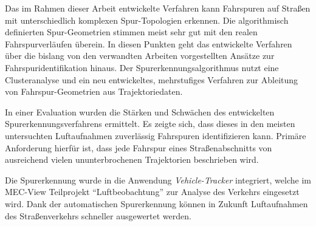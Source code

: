 Das im Rahmen dieser Arbeit entwickelte Verfahren kann Fahrspuren auf Straßen mit unterschiedlich komplexen Spur-Topologien erkennen.
Die algorithmisch definierten Spur-Geometrien stimmen meist sehr gut mit den realen
Fahrspurverläufen überein. In diesen Punkten geht das entwickelte Verfahren über die bislang von den
verwandten Arbeiten vorgestellten Ansätze zur Fahrspuridentifikation hinaus.
Der Spurerkennungsalgorithmus nutzt eine Clusteranalyse und ein neu entwickeltes, mehrstufiges Verfahren zur
Ableitung von Fahrspur-Geometrien aus Trajektoriedaten.

In einer Evaluation wurden die Stärken und Schwächen des entwickelten Spurerkennungsverfahrens ermittelt.
Es zeigte sich, dass dieses in den meisten untersuchten Luftaufnahmen zuverlässig Fahrspuren identifizieren kann.
Primäre Anforderung hierfür ist, dass jede Fahrspur eines Straßenabschnitts von ausreichend vielen ununterbrochenen
Trajektorien beschrieben wird.

Die Spurerkennung wurde in die Anwendung \textit{Vehicle-Tracker} integriert,
welche im MEC-View Teilprojekt ``Luftbeobachtung'' zur Analyse des Verkehrs eingesetzt wird.
Dank der automatischen Spurerkennung können in Zukunft Luftaufnahmen des Straßenverkehrs schneller
ausgewertet werden.
